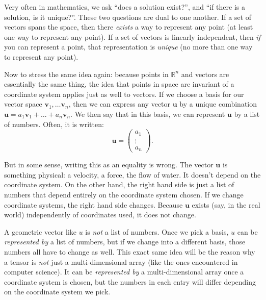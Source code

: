 \documentclass[../master.tex]{subfiles}
\begin{document}

	Very often in mathematics, we ask ``does a solution exist?'', and ``if there is a solution, is it unique?''. These two questions are dual to one another. If a set of vectors spans the space, then there \emph{exists} a way to represent any point (at least one way to represent any point). If a set of vectors is linearly independent, then \emph{if} you can represent a point, that representation is \emph{unique} (no more than one way to represent any point).
	
	Now to stress the same idea again: because points in $\mathbb R^n$ and vectors are essentially the same thing, the idea that points in space are invariant of a coordinate system applies just as well to vectors. If we choose a basis for our vector space $\mathbf v_1, \dots \mathbf v_n$, then we can express any vector $\mathbf u$ by a unique combination $\mathbf u = a_1 \mathbf v_1 + \dots + a_n \mathbf v_n$. We then say that in this basis, we can represent $\mathbf u$ by a list of numbers. Often, it is written:
	\begin{equation*}
		\mathbf u = \begin{pmatrix} a_1 \\ \vdots \\a_n	\end{pmatrix}.
	\end{equation*}
	
	But in some sense, writing this as an equality is wrong. The vector $\mathbf u$ is something physical: a velocity, a force, the flow of water. It doesn't depend on the coordinate system. On the other hand, the right hand side is just a list of numbers that depend entirely on the coordinate system chosen. If we change coordinate systems, the right hand side changes. Because $\mathbf u$ exists (say, in the real world) independently of coordinates used, it does not change.
	
	A geometric vector like $u$ is \emph{not} a list of numbers. Once we pick a basis, $u$ can be \emph{represented by} a list of numbers, but if we change into a different basis, those numbers all have to change as well. This exact same idea will be the reason why a tensor is \emph{not} just a multi-dimensional array (like the ones encountered in computer science). It can be \emph{represented by} a multi-dimensional array once a coordinate system is chosen, but the numbers in each entry will differ depending on the coordinate system we pick. 
	
\end{document}
